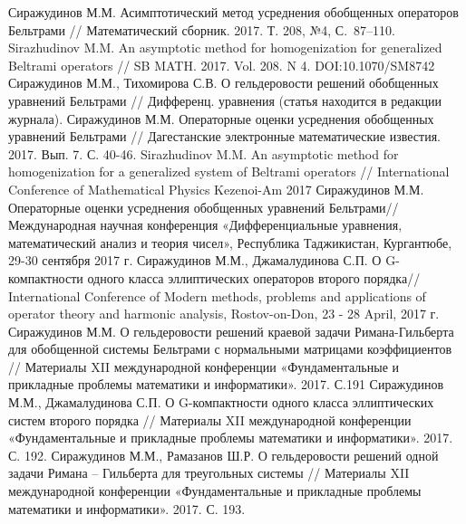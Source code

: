 \begin{thebibliography}{1} %
 Сиражудинов М.М. Асимптотический метод усреднения  обобщенных операторов  Бельтрами // Математический сборник. 2017. Т. 208, №4, С.~87--110.
 Sirazhudinov M.M. An asymptotic method for homogenization for generalized Beltrami operators
 // SB MATH. 2017. Vol. 208. N 4. DOI:10.1070/SM8742
 Сиражудинов М.М., Тихомирова С.В. О гельдеровости решений обобщенных уравнений Бельтрами // Дифференц. уравнения (статья находится в редакции журнала).
 Сиражудинов М.М. Операторные оценки усреднения  обобщенных уравнений  Бельтрами // Дагестанские электронные математические известия. 2017. Вып. 7. С. 40-46.
 Sirazhudinov M.M. An asymptotic method for homogenization for a generalized system of Beltrami operators // International Conference of Mathematical Physics Kezenoi-Am 2017
 Сиражудинов М.М. Операторные оценки усреднения обобщенных уравнений Бельтрами// Международная  научная  конференция «Дифференциальные уравнения, математический анализ  и теория чисел», Республика Таджикистан, Кургантюбе,  29-30 сентября 2017 г.
 Сиражудинов М.М., Джамалудинова С.П. О G-компактности одного класса эллиптических операторов второго порядка// International Conference of Modern methods, problems and applications of operator theory and harmonic analysis, Rostov-on-Don, 23 - 28 April, 2017 г.
 Сиражудинов М.М. О гельдеровости решений краевой задачи Римана-Гильберта для обобщенной системы Бельтрами с нормальными матрицами коэффициентов // Материалы XII международной конференции «Фундаментальные и прикладные проблемы математики и информатики». 2017. С.191
 Сиражудинов М.М., Джамалудинова С.П. О G-компактности одного класса эллиптических систем второго порядка // Материалы XII международной конференции «Фундаментальные и прикладные проблемы математики и информатики». 2017. С. 192.
 Сиражудинов М.М., Рамазанов Ш.Р. О гельдеровости решений одной задачи Римана -- Гильберта для треугольных системы // Материалы XII международной конференции «Фундаментальные и прикладные проблемы математики и информатики». 2017. С. 193.


\end{thebibliography}
